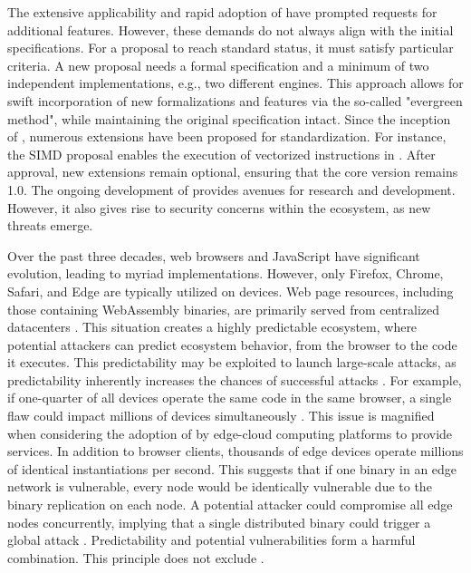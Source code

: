 The extensive applicability and rapid adoption of \Wasm have prompted requests for additional features. 
However, these demands do not always align with the initial specifications. 
For a proposal to reach standard status, it must satisfy particular criteria.
A new proposal needs a formal specification and a minimum of two independent implementations, e.g., two different \Wasm engines. 
This approach allows for swift incorporation of new formalizations and features via the so-called "evergreen method", while maintaining the original \Wasm specification intact. 
Since the inception of \Wasm, numerous extensions have been proposed for standardization. 
For instance, the SIMD proposal enables the execution of vectorized instructions in \Wasm. 
After approval, new extensions remain optional, ensuring that the core \Wasm version remains 1.0. 
The ongoing development of \Wasm provides avenues for research and development. 
However, it also gives rise to security concerns within the ecosystem, as new threats emerge.


Over the past three decades, web browsers and JavaScript have significant evolution, leading to myriad implementations. 
However, only Firefox, Chrome, Safari, and Edge are typically utilized on devices. 
Web page resources, including those containing WebAssembly binaries, are primarily served from centralized datacenters \cite{STRAC}. 
This situation creates a highly predictable ecosystem, where potential attackers can predict ecosystem behavior, from the browser to the code it executes. 
This predictability may be exploited to launch large-scale attacks, as predictability inherently increases the chances of successful attacks \cite{MTDNationalCyberLaep}. 
For example, if one-quarter of all devices operate the same code in the same browser, a single flaw could impact millions of devices simultaneously \cite{goth2003addressing}. 
This issue is magnified when considering the adoption of \Wasm by edge-cloud computing platforms to provide services. 
In addition to browser clients, thousands of edge devices operate millions of identical \Wasm instantiations per second. 
This suggests that if one \Wasm binary in an edge network is vulnerable, every node would be identically vulnerable due to the binary replication on each node. 
A potential attacker could compromise all edge nodes concurrently, implying that a single distributed \Wasm binary could trigger a global attack .
Predictability and potential vulnerabilities form a harmful combination. 
This principle does not exclude \Wasm.



